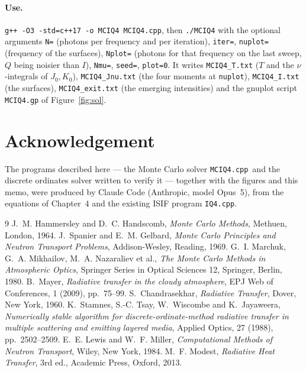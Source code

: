 \documentclass[11pt,a4paper]{article}
\newcommand{\MC}{\texttt{MCIQ4.cpp}}
\newcommand{\ISIF}{\texttt{IQ4.cpp}}
\begin{document}
\paragraph{Use.} \texttt{g++ -O3 -std=c++17 -o MCIQ4 MCIQ4.cpp}, then \texttt{./MCIQ4}
with the optional arguments \texttt{N=} (photons per frequency and per iteration),
\texttt{iter=}, \texttt{nuplot=} (frequency of the surfaces), \texttt{Nplot=} (photons for
that frequency on the last sweep, $Q$ being noisier than $I$), \texttt{Nmu=},
\texttt{seed=}, \texttt{plot=0}. It writes \texttt{MCIQ4\_T.txt} ($T$ and the
$\nu$-integrals of $J_0,K_0$), \texttt{MCIQ4\_Jnu.txt} (the four moments at
\texttt{nuplot}), \texttt{MCIQ4\_I.txt} (the surfaces), \texttt{MCIQ4\_exit.txt} (the
emerging intensities) and the gnuplot script \texttt{MCIQ4.gp} of Figure~\ref{fig:sol}.

\section*{Acknowledgement}
The programs described here --- the Monte Carlo solver \MC\ and the discrete ordinates
solver written to verify it --- together with the figures and this memo, were produced by
Claude Code (Anthropic, model Opus~5), from the equations of Chapter~4 and the existing
ISIF program \ISIF.

\begin{thebibliography}{9}\small
{} J.~M. Hammersley and D.~C. Handscomb, {\em Monte Carlo Methods},
Methuen, London, 1964.
 J.~Spanier and E.~M. Gelbard, {\em Monte Carlo Principles and Neutron
Transport Problems}, Addison-Wesley, Reading, 1969.
 G.~I. Marchuk, G.~A. Mikhailov, M.~A. Nazaraliev et al., {\em The Monte
Carlo Methods in Atmospheric Optics}, Springer Series in Optical Sciences 12, Springer,
Berlin, 1980.
 B.~Mayer, {\em Radiative transfer in the cloudy atmosphere}, EPJ Web of
Conferences, 1 (2009), pp.~75--99.
 S.~Chandrasekhar, {\em Radiative Transfer}, Dover, New York, 1960.
 K.~Stamnes, S.-C. Tsay, W.~Wiscombe and K.~Jayaweera, {\em Numerically
stable algorithm for discrete-ordinate-method radiative transfer in multiple scattering and
emitting layered media}, Applied Optics, 27 (1988), pp.~2502--2509.
 E.~E. Lewis and W.~F. Miller, {\em Computational Methods of Neutron
Transport}, Wiley, New York, 1984.
 M.~F. Modest, {\em Radiative Heat Transfer}, 3rd ed., Academic Press,
Oxford, 2013.
\end{thebibliography}
\end{document}
